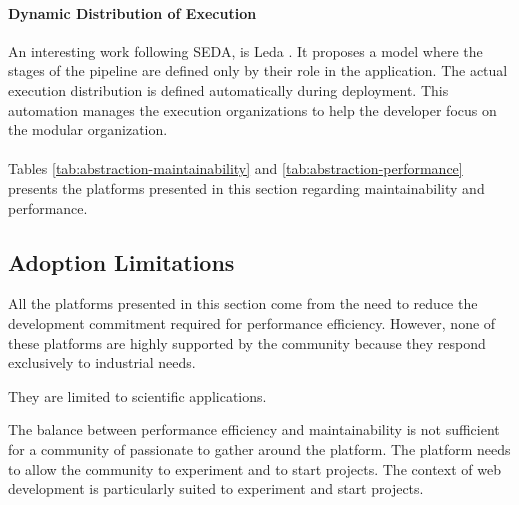 \paragraph{Dynamic Distribution of Execution}

An interesting work following SEDA, is Leda \cite{Salmito2013,Salmito2014}.
It proposes a model where the stages of the pipeline are defined only by their role in the application.
The actual execution distribution is defined automatically during deployment. %
This automation manages the execution organizations to help the developer focus on the modular organization.




\paragraph{}

Tables \ref{tab:abstraction-maintainability} and \ref{tab:abstraction-performance} presents the platforms presented in this section regarding maintainability and performance.





\subsection{Adoption Limitations}

All the platforms presented in this section come from the need to reduce the development commitment required for performance efficiency.
However, none of these platforms are highly supported by the community because they respond exclusively to industrial needs.

They are limited to scientific applications.

The balance between performance efficiency and maintainability is not sufficient for a community of passionate to gather around the platform.
The platform needs to allow the community to experiment and to start projects.
The context of web development is particularly suited to experiment and start projects.

